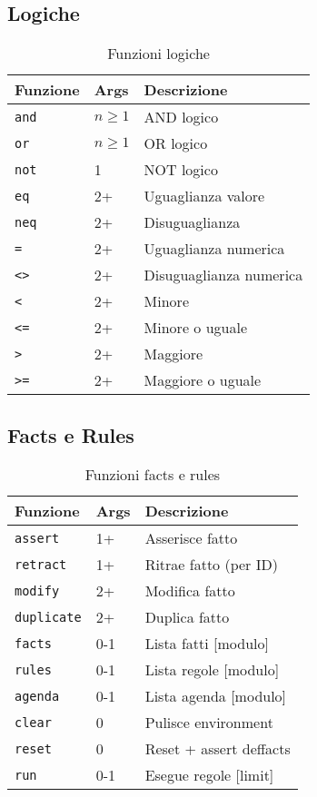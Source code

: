 \subsection{Logiche}

\begin{table}[h]
\centering
\small
\begin{tabular}{@{}llp{6cm}@{}}
\toprule
\textbf{Funzione} & \textbf{Args} & \textbf{Descrizione} \\
\midrule
\texttt{and} & $n \geq 1$ & AND logico \\
\texttt{or} & $n \geq 1$ & OR logico \\
\texttt{not} & 1 & NOT logico \\
\texttt{eq} & 2+ & Uguaglianza valore \\
\texttt{neq} & 2+ & Disuguaglianza \\
\texttt{=} & 2+ & Uguaglianza numerica \\
\texttt{<>} & 2+ & Disuguaglianza numerica \\
\texttt{<} & 2+ & Minore \\
\texttt{<=} & 2+ & Minore o uguale \\
\texttt{>} & 2+ & Maggiore \\
\texttt{>=} & 2+ & Maggiore o uguale \\
\bottomrule
\end{tabular}
\caption{Funzioni logiche}
\label{tab:api_logic}
\end{table}

\subsection{Facts e Rules}

\begin{table}[h]
\centering
\small
\begin{tabular}{@{}llp{6cm}@{}}
\toprule
\textbf{Funzione} & \textbf{Args} & \textbf{Descrizione} \\
\midrule
\texttt{assert} & 1+ & Asserisce fatto \\
\texttt{retract} & 1+ & Ritrae fatto (per ID) \\
\texttt{modify} & 2+ & Modifica fatto \\
\texttt{duplicate} & 2+ & Duplica fatto \\
\texttt{facts} & 0-1 & Lista fatti [modulo] \\
\texttt{rules} & 0-1 & Lista regole [modulo] \\
\texttt{agenda} & 0-1 & Lista agenda [modulo] \\
\texttt{clear} & 0 & Pulisce environment \\
\texttt{reset} & 0 & Reset + assert deffacts \\
\texttt{run} & 0-1 & Esegue regole [limit] \\
\bottomrule
\end{tabular}
\caption{Funzioni facts e rules}
\label{tab:api_facts}
\end{table}

